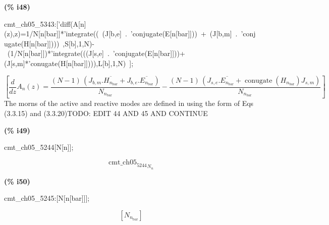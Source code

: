 \documentclass[fleqn]{article}
\begin{document}
\noindent
\begin{minipage}[t]{4.000000em}\color{red}\bfseries
(\% i48)	
\end{minipage}
\begin{minipage}[t]{\textwidth}\color{blue}
cmt\_ch05\_5343:['diff(A[n](z),z)=1/N[n[bar]]*'integrate((\ (J[b,e]\ .\ 'conjugate(E[n[bar]]))\ +\ (J[b,m]\ .\ 'conjugate(H[n[bar]])))\ ,S[b],1,N)-\ (1/N[n[bar]])*'integrate(((J[s,e]\ .\ 'conjugate(E[n[bar]]))+(J[s,m]*'conugate(H[n[bar]]))),L[b],1,N)\ ];
\end{minipage}
\[\displaystyle \tag{\% o48} 
\left[ \frac{d}{d z} {A_n}(z)=\frac{\left( N-1\right) \, \left( {J_{b,m}}\ensuremath{\mathrm{ . }}\overline{{H_{{n_{\ensuremath{\mathrm{bar}}}}}}}+{J_{b,e}}\ensuremath{\mathrm{ . }}\overline{{E_{{n_{\ensuremath{\mathrm{bar}}}}}}}\right) }{{N_{{n_{\ensuremath{\mathrm{bar}}}}}}}-\frac{\left( N-1\right) \, \left( {J_{s,e}}\ensuremath{\mathrm{ . }}\overline{{E_{{n_{\ensuremath{\mathrm{bar}}}}}}}+\operatorname{conugate}\left( {H_{{n_{\ensuremath{\mathrm{bar}}}}}}\right)  {J_{s,m}}\right) }{{N_{{n_{\ensuremath{\mathrm{bar}}}}}}}\right] \mbox{}
\]
The morns of the active and reactive modes are defined in using the form of Eqs (3.3.15) and (3.3.20)TODO: EDIT 44 AND 45 AND CONTINUE


\noindent
\begin{minipage}[t]{4.000000em}\color{red}\bfseries
(\% i49)	
\end{minipage}
\begin{minipage}[t]{\textwidth}\color{blue}
cmt\_ch05\_5244[N[n]];
\end{minipage}
\[\displaystyle \tag{\% o49} 
{{{{\ensuremath{\mathrm{cmt\_ ch05}}}_{\ensuremath{\mathrm{5244}}}}}_{{N_n}}}\mbox{}
\]


\noindent
\begin{minipage}[t]{4.000000em}\color{red}\bfseries
(\% i50)	
\end{minipage}
\begin{minipage}[t]{\textwidth}\color{blue}
cmt\_ch05\_5245:[N[n[bar]]];
\end{minipage}
\[\displaystyle \tag{\% o50} 
\left[ {N_{{n_{\ensuremath{\mathrm{bar}}}}}}\right] \mbox{}
\]
\end{document}
